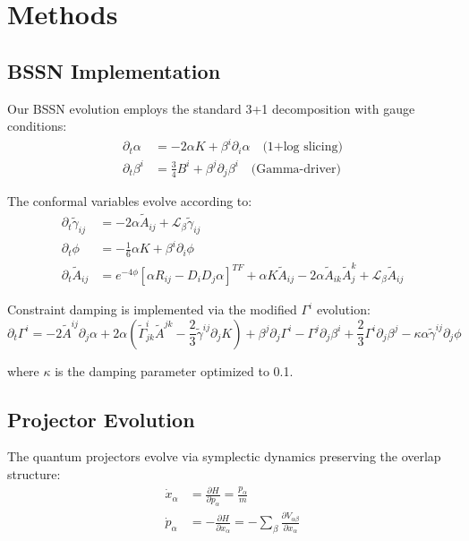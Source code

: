 \documentclass[11pt,a4paper]{article}
\begin{document}
\section{Methods}

\subsection{BSSN Implementation}

Our BSSN evolution employs the standard 3+1 decomposition with gauge conditions:
\begin{align}
\partial_t \alpha &= -2\alpha K + \beta^i \partial_i \alpha \quad \text{(1+log slicing)} \\
\partial_t \beta^i &= \frac{3}{4} B^i + \beta^j \partial_j \beta^i \quad \text{(Gamma-driver)}
\end{align}

The conformal variables evolve according to:
\begin{align}
\partial_t \tilde{\gamma}_{ij} &= -2\alpha \tilde{A}_{ij} + \mathcal{L}_\beta \tilde{\gamma}_{ij} \\
\partial_t \phi &= -\frac{1}{6}\alpha K + \beta^i \partial_i \phi \\
\partial_t \tilde{A}_{ij} &= e^{-4\phi}[\alpha R_{ij} - D_i D_j \alpha]^{TF} + \alpha K \tilde{A}_{ij} - 2\alpha \tilde{A}_{ik}\tilde{A}^k_j + \mathcal{L}_\beta \tilde{A}_{ij}
\end{align}

Constraint damping is implemented via the modified $\Gamma^i$ evolution:
\begin{equation}
\partial_t \Gamma^i = -2\tilde{A}^{ij}\partial_j \alpha + 2\alpha(\tilde{\Gamma}^i_{jk}\tilde{A}^{jk} - \frac{2}{3}\tilde{\gamma}^{ij}\partial_j K) + \beta^j \partial_j \Gamma^i - \Gamma^j \partial_j \beta^i + \frac{2}{3}\Gamma^i \partial_j \beta^j - \kappa \alpha \tilde{\gamma}^{ij} \partial_j \phi
\end{equation}

where $\kappa$ is the damping parameter optimized to 0.1.

\subsection{Projector Evolution}

The quantum projectors evolve via symplectic dynamics preserving the overlap structure:
\begin{align}
\dot{x}_\alpha &= \frac{\partial H}{\partial p_\alpha} = \frac{p_\alpha}{m} \\
\dot{p}_\alpha &= -\frac{\partial H}{\partial x_\alpha} = -\sum_\beta \frac{\partial V_{\alpha\beta}}{\partial x_\alpha}
\end{align}
\end{document}
